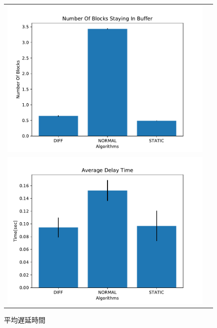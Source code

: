 \documentclass[a4j,12pt]{gradthesis_utf8}
\begin{document}
\begin{figure}[h]
	\begin{center}
		\begin{tabular}{cc}
			\begin{minipage}[t]{0.9\hsize}
				\includegraphics[width=14cm]{figure/NumberOfBlocksStayingInBuffer.pdf}
				\caption{非有効ブロック数}
				\label{nsb}
			\end{minipage}\\
			\begin{minipage}[t]{0.9\hsize}
				\includegraphics[width=14cm]{figure/AverageDelayTime.pdf}
				\caption{平均遅延時間}
				\label{adt}
			\end{minipage}\\
		\end{tabular}
	\end{center}
\end{figure}
\end{document}
